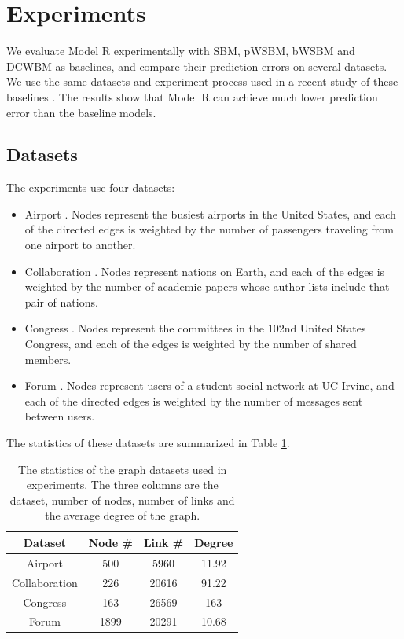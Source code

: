 \documentclass[12pt]{WSUThesis}
\theoremstyle{definition}
\begin{document}
\section{Experiments} \label{section:experiments}
We evaluate Model R experimentally with SBM, pWSBM, bWSBM and DCWBM as baselines,
and compare their prediction errors on several datasets.
We use the same datasets and experiment process used in a recent study of these baselines \cite{aicher2014learning}.
The results show 
that Model R can achieve much lower prediction error than the baseline models.

\subsection{Datasets}
The experiments use four datasets:
\begin{itemize}
	\item Airport \cite{colizza2007reaction}. Nodes represent the busiest airports in the United States, and each of the directed edges is weighted by the number of passengers traveling from one airport to another.
	\item Collaboration \cite{pan2012world}. Nodes represent nations on Earth, and each of the edges	is weighted by the number of academic papers whose author lists include that pair of nations.
	\item Congress \cite{porter2005network}. Nodes represent the committees in the 102nd United States Congress, and each of the edges is weighted by the number of shared members.
	\item Forum \cite{opsahl2009clustering}. Nodes represent users of a student social network at UC Irvine, and each of the directed edges is weighted by the number of messages sent between users.
\end{itemize}
The statistics of these datasets are summarized in Table \ref{tab:datasets}.
\begin{table}[!ht]\centering
	\caption{
		The statistics of the graph datasets used in experiments.
		The three columns are the dataset, number of nodes, number of links and the average degree of the graph.
	}
	\begin{tabular}{cccc}  \hline
		Dataset & Node \# & Link \# & Degree \\ \hline
		Airport & 500 & 5960 & 11.92 \\ \hline
		Collaboration & 226 & 20616 & 91.22 \\ \hline
		Congress & 163 & 26569 & 163 \\ \hline
		Forum  & 1899 & 20291 & 10.68 \\ \hline
	\end{tabular}
	\label{tab:datasets}
\end{table}
\end{document}
